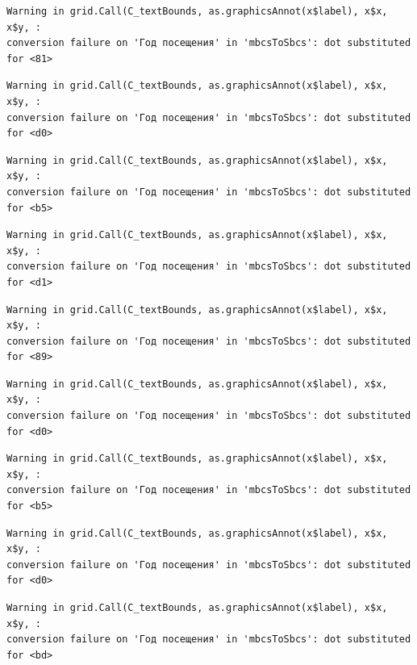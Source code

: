\documentclass[
  letterpaper,
  DIV=11,
  numbers=noendperiod]{scrartcl}
\begin{document}
\begin{verbatim}
Warning in grid.Call(C_textBounds, as.graphicsAnnot(x$label), x$x, x$y, :
conversion failure on 'Год посещения' in 'mbcsToSbcs': dot substituted for <81>
\end{verbatim}

\begin{verbatim}
Warning in grid.Call(C_textBounds, as.graphicsAnnot(x$label), x$x, x$y, :
conversion failure on 'Год посещения' in 'mbcsToSbcs': dot substituted for <d0>
\end{verbatim}

\begin{verbatim}
Warning in grid.Call(C_textBounds, as.graphicsAnnot(x$label), x$x, x$y, :
conversion failure on 'Год посещения' in 'mbcsToSbcs': dot substituted for <b5>
\end{verbatim}

\begin{verbatim}
Warning in grid.Call(C_textBounds, as.graphicsAnnot(x$label), x$x, x$y, :
conversion failure on 'Год посещения' in 'mbcsToSbcs': dot substituted for <d1>
\end{verbatim}

\begin{verbatim}
Warning in grid.Call(C_textBounds, as.graphicsAnnot(x$label), x$x, x$y, :
conversion failure on 'Год посещения' in 'mbcsToSbcs': dot substituted for <89>
\end{verbatim}

\begin{verbatim}
Warning in grid.Call(C_textBounds, as.graphicsAnnot(x$label), x$x, x$y, :
conversion failure on 'Год посещения' in 'mbcsToSbcs': dot substituted for <d0>
\end{verbatim}

\begin{verbatim}
Warning in grid.Call(C_textBounds, as.graphicsAnnot(x$label), x$x, x$y, :
conversion failure on 'Год посещения' in 'mbcsToSbcs': dot substituted for <b5>
\end{verbatim}

\begin{verbatim}
Warning in grid.Call(C_textBounds, as.graphicsAnnot(x$label), x$x, x$y, :
conversion failure on 'Год посещения' in 'mbcsToSbcs': dot substituted for <d0>
\end{verbatim}

\begin{verbatim}
Warning in grid.Call(C_textBounds, as.graphicsAnnot(x$label), x$x, x$y, :
conversion failure on 'Год посещения' in 'mbcsToSbcs': dot substituted for <bd>
\end{verbatim}
\end{document}
